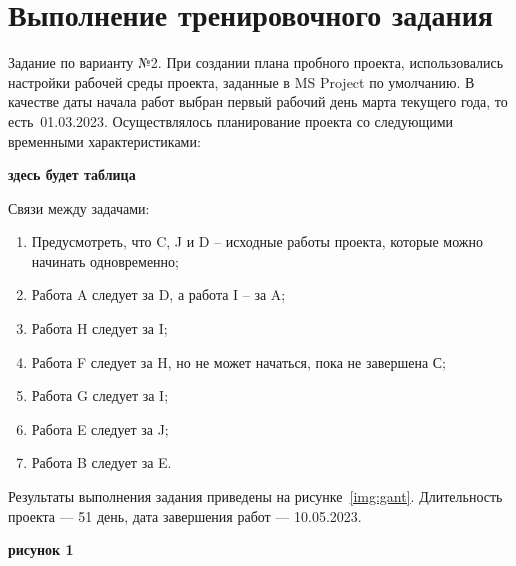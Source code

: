 \chapter{Выполнение тренировочного задания}

Задание по варианту №2. При создании плана пробного проекта, использовались
настройки рабочей среды проекта, заданные в MS Project по умолчанию. В качестве
даты начала работ выбран первый рабочий день марта текущего года, то
есть~01.03.2023. Осуществлялось планирование проекта со следующими временными
характеристиками:

\textbf{здесь будет таблица}

Связи между задачами:

\begin{enumerate}
    \item Предусмотреть, что C, J и D – исходные работы проекта, которые можно начинать одновременно;
    \item Работа A следует за D, а работа I – за A;
    \item Работа H следует за I;
    \item Работа F следует за H, но не может начаться, пока не завершена С;
    \item Работа G следует за I;
    \item Работа E следует за J;
    \item Работа B следует за E.
\end{enumerate}

Результаты выполнения задания приведены на рисунке~\ref{img:gant}.
Длительность проекта --- 51 день, дата завершения работ --- 10.05.2023.

\textbf{рисунок 1}

